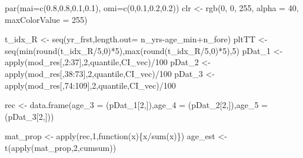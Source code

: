 \documentclass[11pt,]{article}
\newenvironment{Shaded}{}{}
\newcommand{\KeywordTok}[1]{\textcolor[rgb]{0.00,0.00,1.00}{#1}}
\newcommand{\DataTypeTok}[1]{#1}
\newcommand{\DecValTok}[1]{#1}
\newcommand{\FloatTok}[1]{#1}
\newcommand{\StringTok}[1]{\textcolor[rgb]{0.00,0.50,0.50}{#1}}
\newcommand{\ControlFlowTok}[1]{\textcolor[rgb]{0.00,0.00,1.00}{#1}}
\newcommand{\OperatorTok}[1]{#1}
\newcommand{\NormalTok}[1]{#1}
\begin{document}
\begin{Shaded}
\begin{Highlighting}[]
\KeywordTok{par}\NormalTok{(}\DataTypeTok{mai=}\KeywordTok{c}\NormalTok{(}\FloatTok{0.8}\NormalTok{,}\FloatTok{0.8}\NormalTok{,}\FloatTok{0.1}\NormalTok{,}\FloatTok{0.1}\NormalTok{), }\DataTypeTok{omi=}\KeywordTok{c}\NormalTok{(}\DecValTok{0}\NormalTok{,}\FloatTok{0.1}\NormalTok{,}\FloatTok{0.2}\NormalTok{,}\FloatTok{0.2}\NormalTok{))}
\NormalTok{clr <-}\StringTok{ }\KeywordTok{rgb}\NormalTok{(}\DecValTok{0}\NormalTok{, }\DecValTok{0}\NormalTok{, }\DecValTok{255}\NormalTok{, }\DataTypeTok{alpha =} \DecValTok{40}\NormalTok{, }\DataTypeTok{maxColorValue =} \DecValTok{255}\NormalTok{)}

\NormalTok{t_idx_R <-}\StringTok{ }\KeywordTok{seq}\NormalTok{(yr_frst,}\DataTypeTok{length.out=}\NormalTok{ n_yrs}\OperatorTok{-}\NormalTok{age_min}\OperatorTok{+}\NormalTok{n_fore)}
\NormalTok{pltTT <-}\StringTok{ }\KeywordTok{seq}\NormalTok{(}\KeywordTok{min}\NormalTok{(}\KeywordTok{round}\NormalTok{(t_idx_R}\OperatorTok{/}\DecValTok{5}\NormalTok{,}\DecValTok{0}\NormalTok{)}\OperatorTok{*}\DecValTok{5}\NormalTok{),}\KeywordTok{max}\NormalTok{(}\KeywordTok{round}\NormalTok{(t_idx_R}\OperatorTok{/}\DecValTok{5}\NormalTok{,}\DecValTok{0}\NormalTok{)}\OperatorTok{*}\DecValTok{5}\NormalTok{),}\DecValTok{5}\NormalTok{)}
\NormalTok{pDat_}\DecValTok{1}\NormalTok{ <-}\StringTok{ }\KeywordTok{apply}\NormalTok{(mod_res[,}\DecValTok{2}\OperatorTok{:}\DecValTok{37}\NormalTok{],}\DecValTok{2}\NormalTok{,quantile,CI_vec)}\OperatorTok{/}\DecValTok{100}
\NormalTok{pDat_}\DecValTok{2}\NormalTok{ <-}\StringTok{ }\KeywordTok{apply}\NormalTok{(mod_res[,}\DecValTok{38}\OperatorTok{:}\DecValTok{73}\NormalTok{],}\DecValTok{2}\NormalTok{,quantile,CI_vec)}\OperatorTok{/}\DecValTok{100}
\NormalTok{pDat_}\DecValTok{3}\NormalTok{ <-}\StringTok{ }\KeywordTok{apply}\NormalTok{(mod_res[,}\DecValTok{74}\OperatorTok{:}\DecValTok{109}\NormalTok{],}\DecValTok{2}\NormalTok{,quantile,CI_vec)}\OperatorTok{/}\DecValTok{100}

\NormalTok{rec <-}\StringTok{ }\KeywordTok{data.frame}\NormalTok{(}\DataTypeTok{age_3 =}\NormalTok{ (pDat_}\DecValTok{1}\NormalTok{[}\DecValTok{2}\NormalTok{,]),}\DataTypeTok{age_4 =}\NormalTok{ (pDat_}\DecValTok{2}\NormalTok{[}\DecValTok{2}\NormalTok{,]),}\DataTypeTok{age_5 =}\NormalTok{ (pDat_}\DecValTok{3}\NormalTok{[}\DecValTok{2}\NormalTok{,]))}


\NormalTok{mat_prop <-}\StringTok{ }\KeywordTok{apply}\NormalTok{(rec,}\DecValTok{1}\NormalTok{,}\ControlFlowTok{function}\NormalTok{(x)\{x}\OperatorTok{/}\KeywordTok{sum}\NormalTok{(x)\})}
\NormalTok{age_est <-}\StringTok{ }\KeywordTok{t}\NormalTok{(}\KeywordTok{apply}\NormalTok{(mat_prop,}\DecValTok{2}\NormalTok{,cumsum))}


\end{Highlighting}
\end{Shaded}
\end{document}
